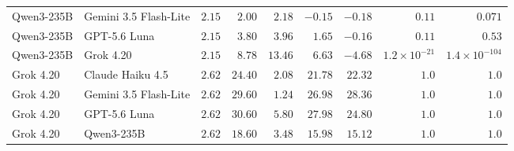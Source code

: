 \begin{table}[!htbp]
\begin{tabular}{@{}llrrrrrrr@{}}
Qwen3-235B & Gemini 3.5 Flash-Lite & $2.15$ & $2.00$ & $2.18$ & $-0.15$ & $-0.18$ & $0.11$ & $0.071$ \\
Qwen3-235B & GPT-5.6 Luna & $2.15$ & $3.80$ & $3.96$ & $1.65$ & $-0.16$ & $0.11$ & $0.53$ \\
Qwen3-235B & Grok 4.20 & $2.15$ & $8.78$ & $13.46$ & $6.63$ & $-4.68$ & $1.2\times10^{-21}$ & $1.4\times10^{-104}$ \\
\addlinespace[2pt]
Grok 4.20 & Claude Haiku 4.5 & $2.62$ & $24.40$ & $2.08$ & $21.78$ & $22.32$ & $1.0$ & $1.0$ \\
Grok 4.20 & Gemini 3.5 Flash-Lite & $2.62$ & $29.60$ & $1.24$ & $26.98$ & $28.36$ & $1.0$ & $1.0$ \\
Grok 4.20 & GPT-5.6 Luna & $2.62$ & $30.60$ & $5.80$ & $27.98$ & $24.80$ & $1.0$ & $1.0$ \\
Grok 4.20 & Qwen3-235B & $2.62$ & $18.60$ & $3.48$ & $15.98$ & $15.12$ & $1.0$ & $1.0$ \\
\bottomrule
\end{tabular}
\end{table}

